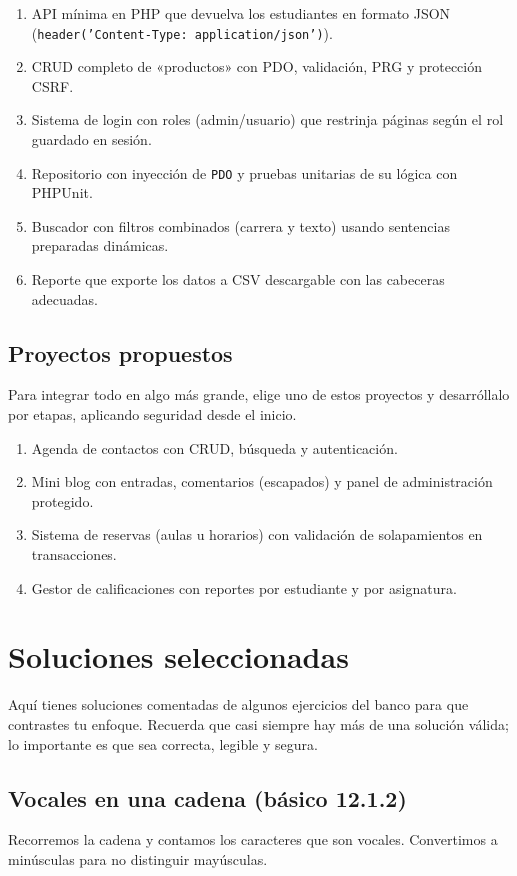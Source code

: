 \documentclass[11pt]{article}
\begin{document}
\begin{enumerate}[leftmargin=1.7em,itemsep=3pt,topsep=2pt]
\item API mínima en PHP que devuelva los estudiantes en formato JSON (\texttt{header('Content-Type:\allowbreak{} application/\allowbreak{}json')}).
\item CRUD completo de «productos» con PDO, validación, PRG y protección CSRF.
\item Sistema de login con roles (admin/usuario) que restrinja páginas según el rol guardado en sesión.
\item Repositorio con inyección de \texttt{PDO} y pruebas unitarias de su lógica con PHPUnit.
\item Buscador con filtros combinados (carrera y texto) usando sentencias preparadas dinámicas.
\item Reporte que exporte los datos a CSV descargable con las cabeceras adecuadas.
\end{enumerate}
\subsection{Proyectos propuestos}
Para integrar todo en algo más grande, elige uno de estos proyectos y desarróllalo por etapas, aplicando seguridad desde el inicio.

\begin{enumerate}[leftmargin=1.7em,itemsep=3pt,topsep=2pt]
\item Agenda de contactos con CRUD, búsqueda y autenticación.
\item Mini blog con entradas, comentarios (escapados) y panel de administración protegido.
\item Sistema de reservas (aulas u horarios) con validación de solapamientos en transacciones.
\item Gestor de calificaciones con reportes por estudiante y por asignatura.
\end{enumerate}
\section{Soluciones seleccionadas}
Aquí tienes soluciones comentadas de algunos ejercicios del banco para que contrastes tu enfoque. Recuerda que casi siempre hay más de una solución válida; lo importante es que sea correcta, legible y segura.

\subsection{Vocales en una cadena (básico 12.1.2)}
Recorremos la cadena y contamos los caracteres que son vocales. Convertimos a minúsculas para no distinguir mayúsculas.
\end{document}
